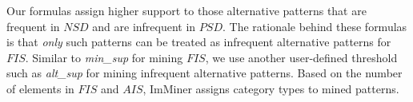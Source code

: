 Our formulas assign higher support to those alternative patterns that are frequent in $NSD$ and are infrequent in $PSD$. The rationale behind these formulas is that \emph{only} such patterns can be treated as infrequent alternative patterns for $FIS$. Similar to \emph{min\_sup} for mining $FIS$, we use another user-defined threshold such as \emph{alt\_sup} for mining infrequent alternative patterns. Based on the number of elements in $FIS$ and $AIS$, ImMiner assigns category types
to mined patterns.

 